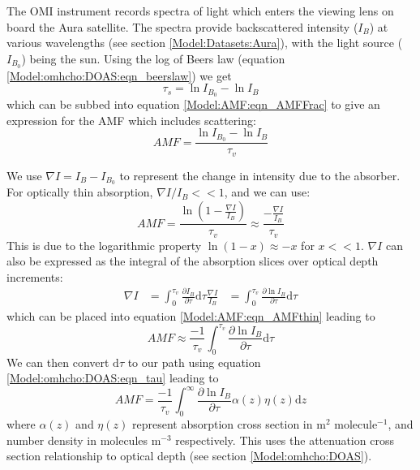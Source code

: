   
  The OMI instrument records spectra of light which enters the viewing lens on board the Aura satellite.
  The spectra provide backscattered intensity ($I_B$) at various wavelengths (see section \ref{Model:Datasets:Aura}), with the light source ($I_{B_0}$) being the sun. 
  Using the log of Beers law (equation \ref{Model:omhcho:DOAS:eqn_beerslaw}) we get 
  $$ \tau_s = \ln{I_{B_0}} - \ln{I_B} $$
  which can be subbed into equation \ref{Model:AMF:eqn_AMFFrac} to give an expression for the AMF which includes scattering:
  \begin{equation} \label{Model:AMF:eqn_amfscattering}
    AMF = \frac{\ln{I_{B_0}}-\ln{I_B}}{\tau_v}
  \end{equation}
  
  We use $\nabla I = I_B - I_{B_0}$ to represent the change in intensity due to the absorber. 
  For optically thin absorption, $\nabla I / I_B << 1$, and we can use:
  \begin{equation} \label{Model:AMF:eqn_AMFthin}
    AMF = \frac{\ln{ \left( 1 - \frac{\nabla I}{I_B} \right)} }{\tau_v} \approx \frac{ - \frac{\nabla I}{I_B} }{\tau_v}
  \end{equation}
  This is due to the logarithmic property $\ln \left(1-x \right) \approx -x$ for $x<<1$.
  $\nabla I$ can also be expressed as the integral of the absorption slices over optical depth increments: 
  \begin{eqnarray*}
    \nabla I &= \int_0^{\tau_v}{\frac{\partial I_B}{\partial \tau} \mathrm{d}\tau}
    \frac{\nabla I}{I_B} & = \int_0^{\tau_v}{\frac{\partial \ln{I_B}}{\partial \tau} \mathrm{d}\tau}
  \end{eqnarray*}
  which can be placed into equation \ref{Model:AMF:eqn_AMFthin} leading to
  \begin{equation*}
    AMF \approx \frac{-1}{\tau_v} \int_0^{\tau_v}{\frac{\partial \ln{I_B}}{\partial \tau} \mathrm{d}\tau}
  \end{equation*}
  We can then convert $\text{d}\tau$ to our path using equation \ref{Model:omhcho:DOAS:eqn_tau} leading to
  \begin{equation} \label{Model:AMF:eqn_AMFcross}
    AMF = \frac{-1}{\tau_v} \int_0^\infty {\frac{\partial \ln{I_B}}{\partial \tau} \alpha(z)\eta(z)\mathrm{d}z}
  \end{equation}
  where $\alpha(z)$ and $\eta(z)$ represent absorption cross section in m$^2$ molecule$^{-1}$, and number density in molecules m$^{-3}$ respectively. 
  This uses the attenuation cross section relationship to optical depth (see section \ref{Model:omhcho:DOAS}).
  
